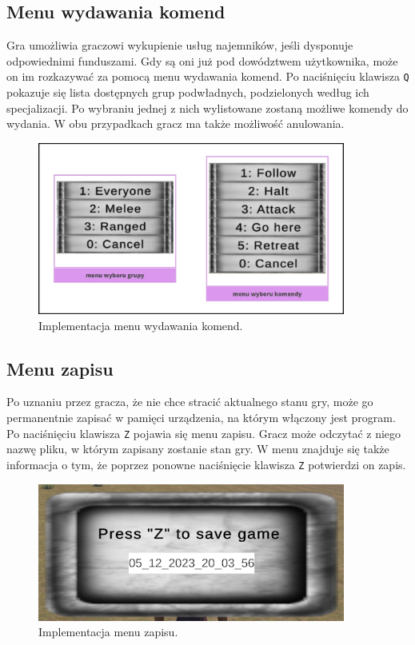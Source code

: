 \subsection{Menu wydawania komend}
Gra umożliwia graczowi wykupienie usług najemników, jeśli dysponuje odpowiednimi funduszami. Gdy są oni już pod dowództwem użytkownika, może on im rozkazywać za pomocą 
menu wydawania komend. Po naciśnięciu klawisza \texttt{Q} pokazuje się lista dostępnych grup podwładnych, podzielonych według ich specjalizacji. Po wybraniu jednej z nich
wylistowane zostaną możliwe komendy do wydania. W obu przypadkach gracz ma także możliwość anulowania.
\begin{figure}[htbp]
    \centering
    \includegraphics[width=0.9\textwidth]{images/ui/opis_ekementow_mwnu_wyboru_komendy.png}
    \caption{Implementacja menu wydawania komend.}\label{fig:cmd_menu}
\end{figure}
\FloatBarrier

\subsection{Menu zapisu}
Po uznaniu przez gracza, że nie chce stracić aktualnego stanu gry, może go permanentnie zapisać w pamięci urządzenia, na którym włączony jest program. Po naciśnięciu 
klawisza \texttt{Z} pojawia się menu zapisu. Gracz może odczytać z niego nazwę pliku, w którym zapisany zostanie stan gry. W menu znajduje się także informacja o tym, że
poprzez ponowne naciśnięcie klawisza \texttt{Z} potwierdzi on zapis.
\begin{figure}[htbp]
    \centering
    \includegraphics[width=0.9\textwidth]{images/ui/menu_zapisu.png}
    \caption{Implementacja menu zapisu.}\label{fig:men_zap}
\end{figure}
\FloatBarrier

